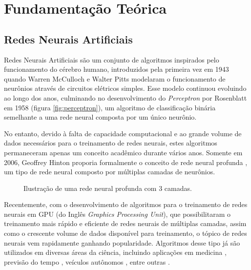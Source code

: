 \chapter{Fundamentação Teórica}

\section{Redes Neurais Artificiais}
\label{sec:dnn}

Redes Neurais Artificiais são um conjunto de algoritmos inspirados pelo funcionamento do cérebro humano, introduzidos pela primeira vez em 1943 quando Warren McCulloch e Walter Pitts modelaram o funcionamento de neurônios através de circuitos elétricos simples\cite{mccullochLogicalCalculusIdeas1943}. 
Esse modelo continuou evoluindo ao longo dos anos, culminando no desenvolvimento do \textit{Perceptron} por Rosenblatt em 1958 \cite{rosenblattPerceptronProbabilisticModel1958} (figura \ref{fig:perceptron}), um algoritmo de classificação binária semelhante a uma rede neural composta por um único neurônio.

No entanto, devido à falta de capacidade computacional e ao grande volume de dados necessários para o treinamento de redes neurais, estes algoritmos permaneceram apenas um conceito acadêmico durante vários anos.
Somente em 2006, Geoffrey Hinton proporia formalmente o conceito de rede neural profunda \cite{hintonFastLearningAlgorithm2006}, um tipo de rede neural composto por múltiplas camadas de neurônios.

\begin{figure}[ht]
    \centering
    
    \caption{Ilustração de uma rede neural profunda com 3 camadas.}
    \label{fig:dnn}
\end{figure}

Recentemente, com o desenvolvimento de algoritmos para o treinamento de redes neurais em GPU (do Inglês \textit{Graphics Processing Unit}), que possibilitaram o treinamento mais rápido e eficiente de redes neurais de múltiplas camadas, assim como o crescente volume de dados disponível para treinamento, o tópico de redes neurais vem rapidamente ganhando popularidade.
Algoritmos desse tipo já são utilizados em diversas áreas da ciência, incluindo aplicações em medicina \cite{hannunCardiologistLevelArrhythmiaDetection2019,phamPredictingHealthcareTrajectories2017,houDeepSFDeepConvolutional2018}, previsão do tempo \cite{akramSequenceSequenceWeather2016}, veículos autônomos \cite{bojarskiEndEndLearning2016,yudinObjectDetectionDeep2019}, entre outras \cite{abiodunStateoftheartArtificialNeural2018}.

